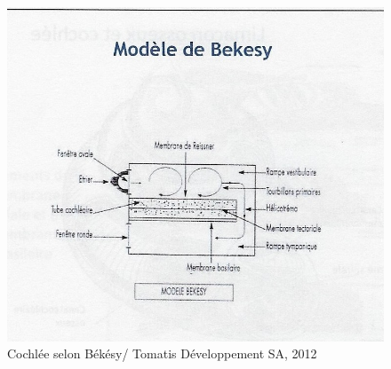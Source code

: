 \begin{figure}
	\centering
	\includegraphics[width=1.0\linewidth]{images/Cochleederoule_bas.jpg}
	\caption[Modèle de Békésy]{Cochlée selon Békésy/ Tomatis Développement SA, 2012}
	\label{fig:cochleederoulebas}
\end{figure}



